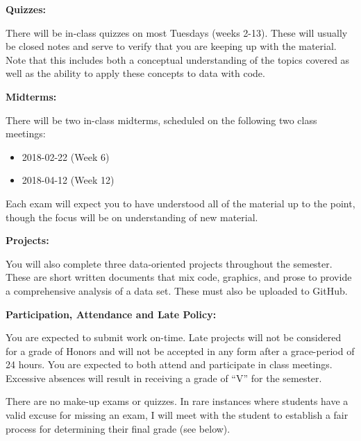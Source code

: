 \documentclass[12pt]{article}
\begin{document}
\vspace{0.4cm}

\textbf{Quizzes:} \vspace{6pt}

There will be in-class quizzes on most Tuesdays (weeks
2-13). These will usually be closed notes and serve to
verify that you are keeping up with the material. Note
that this includes both a conceptual understanding of
the topics covered as well as the ability to apply these
concepts to data with code.

\vspace{0.4cm}

\textbf{Midterms:} \vspace{6pt}

There will be two in-class midterms, scheduled on the
following two class meetings:
\begin{itemize}
\item 2018-02-22 (Week 6)
\item 2018-04-12 (Week 12)
\end{itemize}
Each exam will expect you to have understood all of the
material up to the point, though the focus will be on
understanding of new material.

\newpage

\textbf{Projects:} \vspace{6pt}

You will also complete three data-oriented projects throughout
the semester. These are short written documents that mix code,
graphics, and prose to provide a comprehensive analysis of a
data set.  These must also be uploaded to GitHub.

\vspace{0.4cm}

\textbf{Participation, Attendance and Late Policy:} \vspace{6pt}

You are expected to submit work on-time. Late projects will not
be considered for a grade of Honors and will not be accepted in
any form after a grace-period of 24 hours. You are expected to both
attend and participate in class meetings. Excessive absences will
result in receiving a grade of ``V'' for the semester.

\bigskip

There are no make-up exams or quizzes. In rare instances where
students have a valid excuse for missing an exam, I will meet
with the student to establish a fair process for determining their
final grade (see below).
\end{document}
